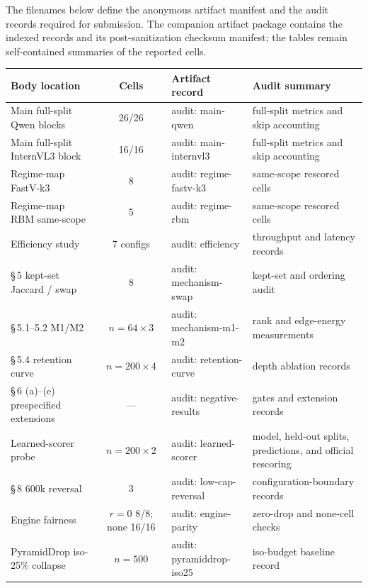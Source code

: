 \documentclass[journal]{IEEEtran}
\begin{document}
\noindent The filenames below define the anonymous artifact manifest and the
audit records required for submission. The companion artifact package contains
the indexed records and its post-sanitization checksum manifest; the tables
remain self-contained summaries of the reported cells.

\begin{table}[ht]
  \centering
  \small
  \begin{tabular}{@{}p{3.0cm} c p{4.6cm} p{4.6cm}@{}}
    \toprule
    Body location & Cells & Artifact record & Audit summary \\
    \midrule
    Main full-split Qwen blocks       & 26/26        & audit: main-qwen & full-split metrics and skip accounting \\
    Main full-split InternVL3 block   & 16/16        & audit: main-internvl3 & full-split metrics and skip accounting \\
    Regime-map FastV-k3               & 8            & audit: regime-fastv-k3 & same-scope rescored cells \\
    Regime-map RBM same-scope         & 5            & audit: regime-rbm & same-scope rescored cells \\
    Efficiency study                  & 7 configs    & audit: efficiency & throughput and latency records \\
    \S\,5 kept-set Jaccard / swap     & 8            & audit: mechanism-swap & kept-set and ordering audit \\
    \S\,5.1--5.2 M1/M2                & $n=64 \times 3$ & audit: mechanism-m1-m2 & rank and edge-energy measurements \\
    \S\,5.4 retention curve           & $n=200 \times 4$ & audit: retention-curve & depth ablation records \\
    \S\,6 (a)--(e) prespecified extensions & ---      & audit: negative-results & gates and extension records \\
    Learned-scorer probe                   & $n=200 \times 2$ & audit: learned-scorer & model, held-out splits, predictions, and official rescoring \\
    \S\,8 600k reversal               & 3            & audit: low-cap-reversal & configuration-boundary records \\
    Engine fairness                   & $r{=}0$ 8/8; none 16/16 & audit: engine-parity & zero-drop and none-cell checks \\
    PyramidDrop iso-25\% collapse     & $n = 500$    & audit: pyramiddrop-iso25 & iso-budget baseline record \\
    \bottomrule
  \end{tabular}
\end{table}
\end{document}
